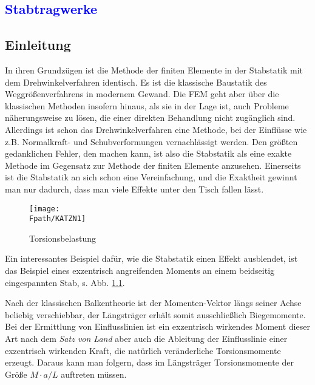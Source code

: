 {\textcolor{blue}{\chapter{Stabtragwerke}}}
\label{sec:drei}
{\textcolor{sectionTitleBlue}{\section{Einleitung}}}

In ihren Grundz\"{u}gen ist die Methode der finiten Elemente in der Stabstatik mit dem Drehwinkelverfahren identisch. Es ist die klassische Baustatik des Weggr\"{o}{\ss}enverfahrens in modernem Gewand. Die FEM geht aber \"{u}ber die klassischen Methoden insofern hinaus, als sie in der Lage ist, auch Probleme n\"{a}herungsweise zu l\"{o}sen, die einer direkten Behandlung nicht zug\"{a}nglich sind. Allerdings ist schon das Drehwinkelverfahren eine Methode, bei der Einfl\"{u}sse wie z.B. Normalkraft- und Schubverformungen vernachl\"{a}ssigt werden. Den gr\"{o}{\ss}ten gedanklichen Fehler, den machen kann, ist also die Stabstatik als eine exakte Methode im Gegensatz zur Methode der finiten Elemente anzusehen. Einerseits ist die Stabstatik an sich schon eine Vereinfachung, und die Exaktheit gewinnt man nur dadurch, dass man viele Effekte unter den Tisch fallen l\"{a}sst.
\begin{figure}[tbp] \centering
\if {} \sidecaption \fi
\texttt{[image: \\Fpath/KATZN1]}
\caption{Torsionsbelastung}
\label{KatzN1}%
\end{figure}%

Ein interessantes Beispiel daf\"{u}r, wie die Stabstatik einen Effekt ausblendet, ist das Beispiel eines exzentrisch angreifenden Moments an einem beidseitig eingespannten Stab, s. Abb. \ref{KatzN1}.

Nach der klassischen Balkentheorie ist der Momenten-Vektor l\"{a}ngs seiner Achse beliebig verschiebbar, der L\"{a}ngstr\"{a}ger erh\"{a}lt somit ausschlie{\ss}lich Biegemomente. Bei der Ermittlung von Einflusslinien ist ein exzentrisch wirkendes Moment dieser Art nach dem {\em Satz von Land\/} aber auch die Ableitung der Einflusslinie einer exzentrisch wirkenden Kraft, die nat\"{u}rlich ver\"{a}nderliche Torsionsmomente erzeugt. Daraus kann man folgern, dass im L\"{a}ngstr\"{a}ger Torsionsmomente der Gr\"{o}{\ss}e $M \cdot a/L$ auftreten m\"{u}ssen.

